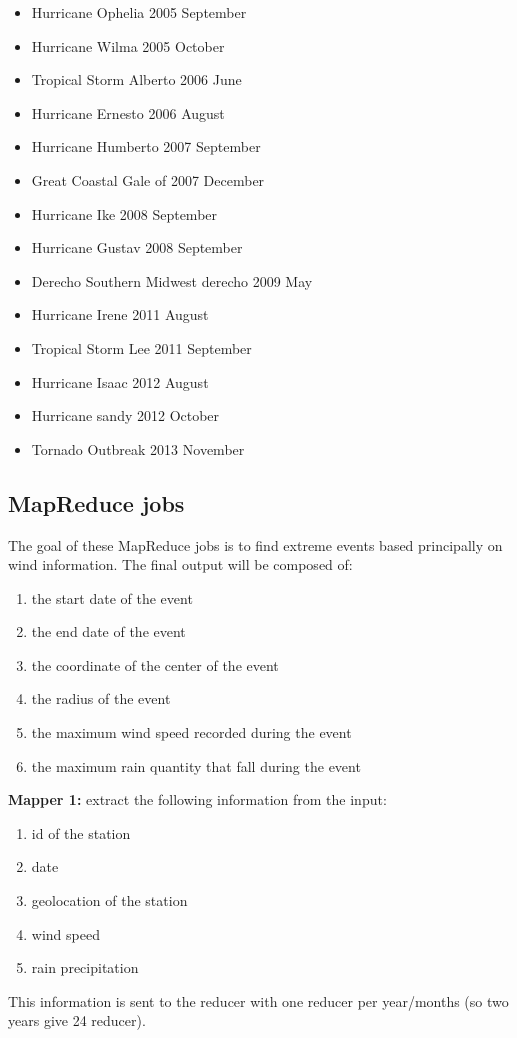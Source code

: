 \begin{multicols}{2}
\begin{itemize}
\item Hurricane Ophelia 2005 September
\item Hurricane Wilma 2005 October
\item Tropical Storm Alberto 2006 June
\item Hurricane Ernesto 2006 August
\item Hurricane Humberto 2007 September
\item Great Coastal Gale of 2007 December
\item Hurricane Ike 2008 September
\item Hurricane Gustav 2008 September
\item Derecho Southern Midwest derecho 2009 May
\item Hurricane Irene 2011 August
\item Tropical Storm Lee 2011 September
\item Hurricane Isaac 2012 August
\item Hurricane sandy 2012 October
\item Tornado Outbreak 2013 November
\end{itemize}
\end{multicols}
\subsection{MapReduce jobs}
\noindent
The goal of these MapReduce jobs is to find extreme events based principally on wind information. The final output will be composed of:
\begin{enumerate}
\item the start date of the event
\item the end date of the event
\item the coordinate of the center of the event
\item the radius of the event
\item the maximum wind speed recorded during the event
\item the maximum rain quantity that fall during the event
\end{enumerate}
\noindent
\textbf{Mapper 1:} extract the following information from the input:
\begin{enumerate}
\item id of the station
\item date
\item geolocation of the station
\item wind speed
\item rain precipitation
\end{enumerate}
\noindent
This information is sent to the reducer with one reducer per year/months (so two years give 24 reducer).



